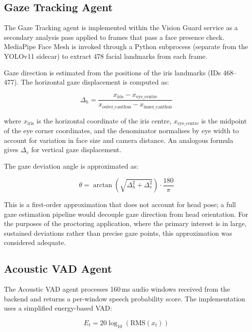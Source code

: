 \subsection{Gaze Tracking Agent}

The Gaze Tracking agent is implemented within the Vision Guard service as a secondary analysis pass applied to frames that pass a face presence check. MediaPipe Face Mesh is invoked through a Python subprocess (separate from the YOLOv11 sidecar) to extract 478 facial landmarks from each frame.

Gaze direction is estimated from the positions of the iris landmarks (IDs 468--477). The horizontal gaze displacement is computed as:

\begin{equation}
    \Delta_h = \frac{x_{\text{iris}} - x_{\text{eye\_centre}}}{x_{\text{outer\_canthus}} - x_{\text{inner\_canthus}}}
    \label{eq:gaze_h}
\end{equation}

where $x_{\text{iris}}$ is the horizontal coordinate of the iris centre, $x_{\text{eye\_centre}}$ is the midpoint of the eye corner coordinates, and the denominator normalises by eye width to account for variation in face size and camera distance. An analogous formula gives $\Delta_v$ for vertical gaze displacement.

The gaze deviation angle is approximated as:

\begin{equation}
    \theta = \arctan\left(\sqrt{\Delta_h^2 + \Delta_v^2}\right) \cdot \frac{180}{\pi}
    \label{eq:gaze_angle}
\end{equation}

This is a first-order approximation that does not account for head pose; a full gaze estimation pipeline would decouple gaze direction from head orientation. For the purposes of the proctoring application, where the primary interest is in large, sustained deviations rather than precise gaze points, this approximation was considered adequate.

\subsection{Acoustic VAD Agent}

The Acoustic VAD agent processes 160\,ms audio windows received from the backend and returns a per-window speech probability score. The implementation uses a simplified energy-based VAD:

\begin{equation}
    E_t = 20 \log_{10}\left(\text{RMS}(x_t)\right)
    \label{eq:energy}
\end{equation}

